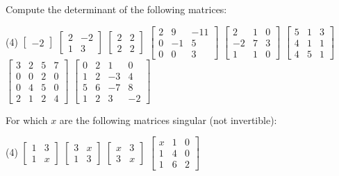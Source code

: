 \begin{exercise}
\pagebreak[2]
Compute the determinant of the following matrices:
\begin{tasks}(4)
\task
$\begin{bmatrix}
-2
\end{bmatrix}$
\task
$\begin{bmatrix}
2 & -2 \\
1 & 3
\end{bmatrix}$
\task
$\begin{bmatrix}
2 & 2 \\
2 & 2
\end{bmatrix}$
\task
$\begin{bmatrix}
2 & 9 & -11 \\
0 & -1 & 5 \\
0 & 0 & 3
\end{bmatrix}$
\task
$\begin{bmatrix}
2 & 1 & 0 \\
-2 & 7 & 3 \\
1 & 1 & 0
\end{bmatrix}$
\task
$\begin{bmatrix}
5 & 1 & 3 \\
4 & 1 & 1 \\
4 & 5 & 1
\end{bmatrix}$
\task
$\begin{bmatrix}
3 & 2 & 5 & 7 \\
0 & 0 & 2 & 0 \\
0 & 4 & 5 & 0 \\
2 & 1 & 2 & 4
\end{bmatrix}$
\task
$\begin{bmatrix}
 0 &  2 &  1 &  0 \\
 1 &  2 & -3 &  4 \\
 5 &  6 & -7 &  8 \\
 1 &  2 &  3 & -2
\end{bmatrix}$
\end{tasks}
\end{exercise}

\begin{exercise}
For which $x$ are the following matrices singular (not invertible):
\begin{tasks}(4)
\task
$\begin{bmatrix}
1 & 3 \\
1 & x
\end{bmatrix}$
\task
$\begin{bmatrix}
3 & x \\
1 & 3
\end{bmatrix}$
\task
$\begin{bmatrix}
x & 3 \\
3 & x
\end{bmatrix}$
\task
$\begin{bmatrix}
x & 1 & 0 \\
1 & 4 & 0 \\
1 & 6 & 2
\end{bmatrix}$
\end{tasks}
\end{exercise}

